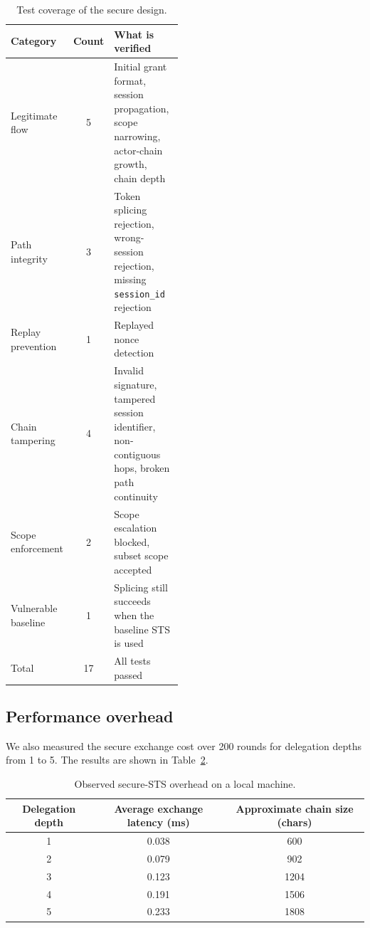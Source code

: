 \documentclass[11pt]{article}
\begin{document}
\begin{table}[htbp]
  \centering
  \begin{tabular}{l c p{0.48\linewidth}}
    \toprule
    Category & Count & What is verified \\
    \midrule
    Legitimate flow & 5 & Initial grant format, session propagation, scope narrowing, actor-chain growth, chain depth \\
    Path integrity & 3 & Token splicing rejection, wrong-session rejection, missing \texttt{session\_id} rejection \\
    Replay prevention & 1 & Replayed nonce detection \\
    Chain tampering & 4 & Invalid signature, tampered session identifier, non-contiguous hops, broken path continuity \\
    Scope enforcement & 2 & Scope escalation blocked, subset scope accepted \\
    Vulnerable baseline & 1 & Splicing still succeeds when the baseline STS is used \\
    \midrule
    Total & 17 & All tests passed \\
    \bottomrule
  \end{tabular}
  \caption{Test coverage of the secure design.}
  \label{tab:tests}
\end{table}

\subsection{Performance overhead}
We also measured the secure exchange cost over 200 rounds for delegation depths from 1 to 5. The results are shown in Table~\ref{tab:perf}.

\begin{table}[htbp]
  \centering
  \begin{tabular}{c c c}
    \toprule
    Delegation depth & Average exchange latency (ms) & Approximate chain size (chars) \\
    \midrule
    1 & 0.038 & 600 \\
    2 & 0.079 & 902 \\
    3 & 0.123 & 1204 \\
    4 & 0.191 & 1506 \\
    5 & 0.233 & 1808 \\
    \bottomrule
  \end{tabular}
  \caption{Observed secure-STS overhead on a local machine.}
  \label{tab:perf}
\end{table}
\end{document}
